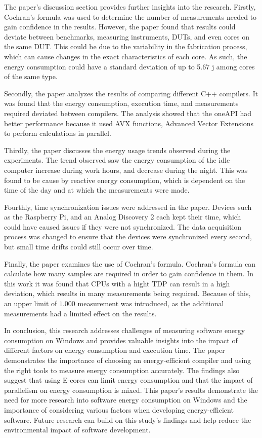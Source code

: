 The paper's discussion section provides further insights into the research. Firstly, Cochran's formula was used to determine the number of measurements needed to gain confidence in the results. However, the paper found that results could deviate between benchmarks, measuring instruments, DUTs, and even cores on the same DUT. This could be due to the variability in the fabrication process, which can cause changes in the exact characteristics of each core. As such, the energy consumption could have a standard deviation of up to 5.67 j among cores of the same type.

Secondly, the paper analyzes the results of comparing different C++ compilers. It was found that the energy consumption, execution time, and measurements required deviated between compilers. The analysis showed that the oneAPI had better performance because it used AVX functions, Advanced Vector Extensions to perform calculations in parallel.

Thirdly, the paper discusses the energy usage trends observed during the experiments. The trend observed saw the energy consumption of the idle computer increase during work hours, and decrease during the night. This was found to be cause by reactive energy consumption, which is dependent on the time of the day and at which the measurements were made. 

Fourthly, time synchronization issues were addressed in the paper. Devices such as the Raspberry Pi, and an Analog Discovery 2 each kept their time, which could have caused issues if they were not synchronized. The data acquisition process was changed to ensure that the devices were synchronized every second, but small time drifts could still occur over time.

Finally, the paper examines the use of Cochran's formula. Cochran's formula can calculate how many samples are required in order to gain confidence in them. In this work it was found that CPUs with a hight TDP can result in a high deviation, which results in many measurements being required. Because of this, an upper limit of $1.000$ measurement was introduced, as the additional measurements had a limited effect on the results.


In conclusion, this research addresses challenges of measuring software energy consumption on Windows and provides valuable insights into the impact of different factors on energy consumption and execution time. The paper demonstrates the importance of choosing an energy-efficient compiler and using the right tools to measure energy consumption accurately. The findings also suggest that using E-cores can limit energy consumption and that the impact of parallelism on energy consumption is mixed. This paper's results demonstrate the need for more research into software energy consumption on Windows and the importance of considering various factors when developing energy-efficient software. Future research can build on this study's findings and help reduce the environmental impact of software development. 

